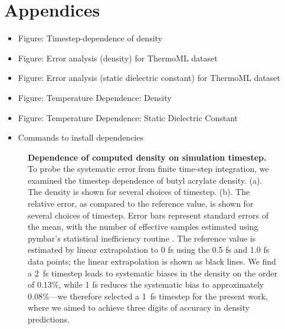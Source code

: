 \documentclass[aps,pre,twocolumn,nofootinbib,superscriptaddress,linenumbers]{revtex4-1}
\begin{document}
\section{Appendices}

\begin{itemize}
 \item Figure: Timestep-dependence of density
 \item Figure: Error analysis (density) for ThermoML dataset
 \item Figure: Error analysis (static dielectric constant) for ThermoML dataset
 \item Figure: Temperature Dependence: Density
 \item Figure: Temperature Dependence: Static Dielectric Constant
 \item Commands to install dependencies
\end{itemize}

\clearpage


\begin{figure}


\caption{
{\bf Dependence of computed density on simulation timestep.}
To probe the systematic error from finite time-step integration, we examined the timestep dependence of butyl acrylate density.  
(a).  The density is shown for several choices of timestep.  
(b).  The relative error, as compared to the reference value, is shown for several choices of timestep.  
Error bars represent standard errors of the mean, with the number of effective samples estimated using pymbar's statistical inefficiency routine \cite{shirts2008statistically}.  
The reference value is estimated by linear extrapolation to 0 fs using the 0.5 fs and 1.0 fs data points; the linear extrapolation is shown as black lines.  
We find a 2~fs timestep leads to systematic biases in the density on the order of 0.13\%, while 1 fs reduces the systematic bias to approximately 0.08\%---we therefore selected a 1~fs timestep for the present work, where we aimed to achieve three digits of accuracy in density predictions.
}
\label{figure:timestep}

\end{figure}




\end{document}
